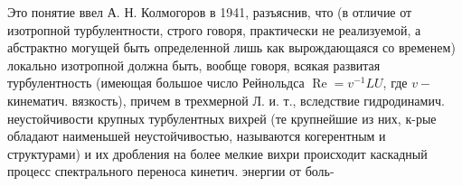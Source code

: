 \documentclass[10pt]{article}
\begin{document}
Это понятие ввел А. Н. Колмогоров в 1941, разъяснив, что (в отличие от изотропной турбулентности, строго говоря, практически не реализуемой, а абстрактно могущей быть определенной лишь как вырождающаяся со временем) локально изотропной должна быть, вообще говоря, всякая развитая турбулентность (имеющая большое число Рейнольдса $\operatorname{Re}=v^{-1} L U$, где $v-$ кинематич. вязкость), причем в трехмерной Л. и. т., вследствие гидродинамич. неустойчивости крупных турбулентных вихрей (те крупнейшие из них, к-рые обладают наименьшей неустойчивостью, называются когерентным и структурами) и их дробления на более мелкие вихри происходит каскадный процесс спектрального переноса кинетич. энергии от боль-
\end{document}
